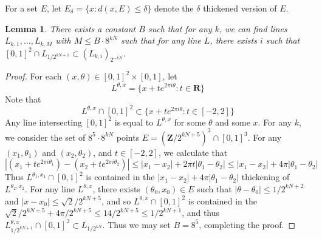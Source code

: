\documentclass[dvipsnames,letterpaper,12pt]{article}
\numberwithin{equation}{section}
\theoremstyle{plain}
\newtheorem{lemma}{Lemma}
\begin{document}
For a set $E$, let $E_\delta = \{ x: d(x,E) \leq \delta \}$ denote the $\delta$ thickened version of $E$.

\begin{lemma} \label{lineCounting}
	There exists a constant $B$ such that for any $k$, we can find lines $L_{k,1}, \dots, L_{k,M}$ with $M \leq B \cdot 8^{kN}$ such that for any line $L$, there exists $i$ such that $[0,1]^2 \cap L_{1/2^{kN+1}} \subset (L_{k,i})_{2^{-kN}}$.
\end{lemma}
\begin{proof}
	For each $(x,\theta) \in [0,1]^2 \times [0,1]$, let
	\[ L^{\theta,x} = \{ x + t e^{2 \pi i \theta} : t \in \mathbf{R} \} \]
	Note that
	\[ L^{\theta,x} \cap [0,1]^2 \subset \{ x + t e^{2 \pi i \theta} : t \in [-2,2] \} \]
	Any line intersecting $[0,1]^2$ is equal to $L^{\theta,x}$ for some $\theta$ and some $x$. For any $k$, we consider the set of $8^5 \cdot 8^{kN}$ points $E = (\mathbf{Z}/2^{kN+5})^3 \cap [0,1]^3$. For any $(x_1,\theta_1)$ and $(x_2,\theta_2)$, and $t \in [-2,2]$, we calculate that
	\[ |(x_1 + t e^{2 \pi i \theta_1}) - (x_2 + te^{2 \pi i \theta_2})| \leq |x_1 - x_2| + 2 \pi t |\theta_1 - \theta_2| \leq |x_1 - x_2| + 4 \pi |\theta_1 - \theta_2| \]
	Thus $L^{\theta_1,x_1} \cap [0,1]^2$ is contained in the $|x_1 - x_2| + 4 \pi |\theta_1 - \theta_2|$ thickening of $L^{\theta_2,x_2}$. For any line $L^{\theta,x}$, there exists $(\theta_0,x_0) \in E$ such that $|\theta - \theta_0| \leq 1/2^{kN+2}$ and $|x - x_0| \leq \sqrt{2}/2^{kN+5}$, and so $L^{\theta,x} \cap [0,1]^2$ is contained in the $\sqrt{2}/2^{kN+5} + 4\pi/2^{kN+5} \leq 14/2^{kN+5} \leq 1/2^{kN+1}$, and thus $L^{\theta,x}_{1/2^{kN+1}} \cap [0,1]^2 \subset L_{1/2^{kN}}$. Thus we may set $B = 8^5$, completing the proof.
\end{proof}
\end{document}

